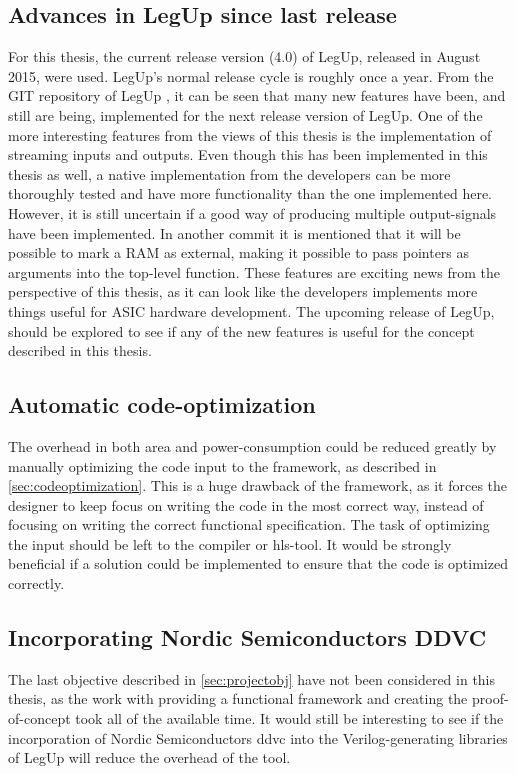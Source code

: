 \subsection{Advances in LegUp since last release}
For this thesis, the current release version (4.0) of LegUp, released in August 2015, were used. LegUp's normal release cycle is roughly once a year. From the GIT repository of LegUp \cite{legupgit}, it can be seen that many new features have been, and still are being, implemented for the next release version of LegUp. One of the more interesting features from the views of this thesis is the implementation of streaming inputs and outputs. Even though this has been implemented in this thesis as well, a native implementation from the developers can be more thoroughly tested and have more functionality than the one implemented here. However, it is still uncertain if a good way of producing multiple output-signals have been implemented. In another commit it is mentioned that it will be possible to mark a RAM as external, making it possible to pass pointers as arguments into the top-level function. These features are exciting news from the perspective of this thesis, as it can look like the developers implements more things useful for ASIC hardware development. The upcoming release of LegUp, should be explored to see if any of the new features is useful for the concept described in this thesis. 

\subsection{Automatic code-optimization}
The overhead in both area and power-consumption could be reduced greatly by manually optimizing the code input to the framework, as described in \cref{sec:codeoptimization}. This is a huge drawback of the framework, as it forces the designer to keep focus on writing the code in the most correct way, instead of focusing on writing the correct functional specification. The task of optimizing the input should be left to the compiler or \gls{hls}-tool. It would be strongly beneficial if a solution could be implemented to ensure that the code is optimized correctly.

\subsection{Incorporating Nordic Semiconductors DDVC}
The last objective described in \cref{sec:projectobj} have not been considered in this thesis, as the work with providing a functional framework and creating the proof-of-concept took all of the available time. It would still be interesting to see if the incorporation of Nordic Semiconductors \gls{ddvc} into the Verilog-generating libraries of LegUp will reduce the overhead of the tool.